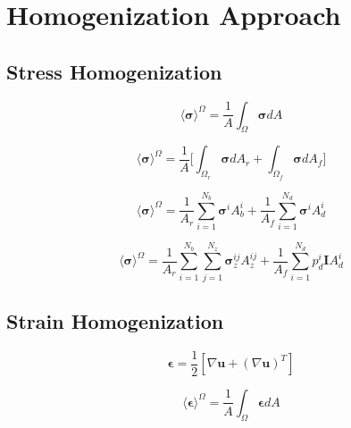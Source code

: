 \section{Homogenization Approach}

\subsection{Stress Homogenization}

\begin{equation}
\label{eqn:stress1}
\langle \boldsymbol{\sigma} \rangle^\Omega = 
\frac{1}{A} \int_\Omega \boldsymbol{\sigma} { dA}
\end{equation}

\begin{equation}
\label{eqn:stress2}
\langle \boldsymbol{\sigma} \rangle^\Omega = 
\frac{1}{A} \bigg \lbrack {\int_{\Omega_{r}} \boldsymbol{\sigma} { dA_r} + 
\int_{\Omega_{f}} \boldsymbol{\sigma} { dA_f}} \bigg \rbrack
\end{equation}

\begin{equation}
\label{eqn:stress3}
\langle \boldsymbol{\sigma} \rangle^\Omega = 
\frac{1}{A_{r}} \sum_{i=1}^{N_{b}} \boldsymbol{\sigma}^{i} A_{b}^{i} + 
\frac{1}{A_{f}} \sum_{i=1}^{N_{d}} \boldsymbol{\sigma}^{i} A_{d}^{i}
\end{equation}

\begin{equation}
\label{eqn:stress4}
\langle \boldsymbol{\sigma} \rangle^\Omega = 
\frac{1}{A_{r}} \sum_{i=1}^{N_{b}} \sum_{j=1}^{N_{z}} \boldsymbol{\sigma}_z^{ij} A_{z}^{ij} + 
\frac{1}{A_{f}} \sum_{i=1}^{N_{d}} p_d^{i} \textbf{I} A_{d}^{i}
\end{equation}

\subsection{Strain Homogenization}

\begin{equation}
\label{eqn:strain1}
\boldsymbol{\epsilon} = 
\frac{1}{2}  \left[ \nabla \mathbf{u} + \left( \nabla \mathbf{u} \right)^{T} \right]
\end{equation}

\begin{equation}
\label{eqn:strain2}
\langle \boldsymbol{\epsilon} \rangle^\Omega = 
\frac{1}{A} \int_\Omega \boldsymbol{\epsilon} { dA}
\end{equation}

